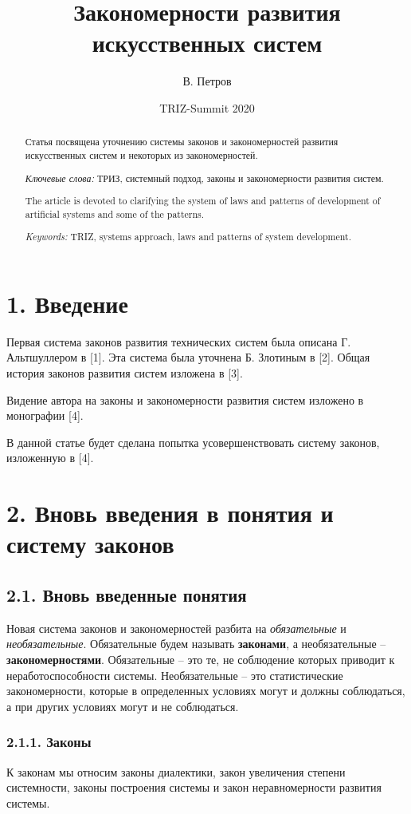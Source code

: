 \documentclass[11pt,a4paper]{article}
\title{Закономерности развития искусственных систем}
\author{В. Петров}
\date{TRIZ-Summit 2020}
\begin{document}
\maketitle
\begin{abstract}
  Статья посвящена уточнению системы законов и закономерностей развития искусственных
  систем и некоторых из закономерностей.

  \emph{Ключевые слова:} ТРИЗ, системный подход, законы и закономерности
  развития систем.
  
  The article is devoted to clarifying the system of laws and patterns of
  development of artificial systems and some of the patterns.

  \emph{Keywords:} TRIZ, systems approach, laws and patterns of system
  development.
\end{abstract}

\section*{1. Введение}
Первая система законов развития технических систем была описана
Г. Альтшуллером в [1]. Эта система была уточнена Б. Злотиным в [2]. Общая
история законов развития систем изложена в [3].

Видение автора на законы и закономерности развития систем изложено в
монографии [4].

В данной статье будет сделана попытка усовершенствовать систему законов,
изложенную в [4].

\section*{2. Вновь введения в понятия и систему законов}
\subsection*{2.1. Вновь введенные понятия}
Новая система законов и закономерностей разбита на \emph{обязательные} и
\emph{необязательные}. Обязательные будем называть \textbf{законами}, а
необязательные – \textbf{закономерностями}. Обязательные – это те, не
соблюдение которых приводит к неработоспособности системы. Необязательные –
это статистические закономерности, которые в определенных условиях могут и
должны соблюдаться, а при других условиях могут и не соблюдаться.

\subsubsection*{2.1.1. Законы}
К законам мы относим законы диалектики, закон увеличения степени системности,
законы построения системы и закон неравномерности развития системы.
\end{document}
